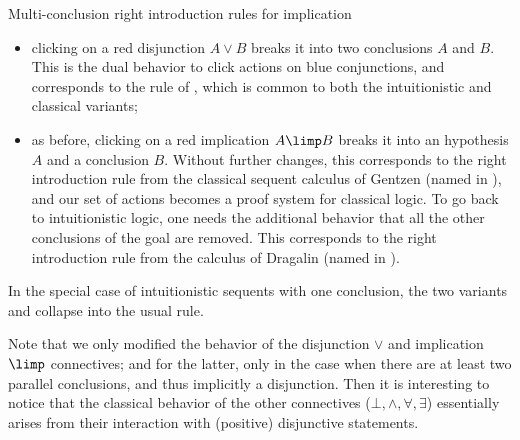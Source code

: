 \begin{marginfigure}
  \caption{Multi-conclusion right introduction rules for implication}
\end{marginfigure}

\begin{itemize}
  \item clicking on a red disjunction $A \lor B$ breaks it into two conclusions
  $A$ and $B$. This is the dual behavior to click actions on blue conjunctions,
  and corresponds to the {} rule of , which is
  common to both the intuitionistic and classical variants;
  \item as before, clicking on a red implication $A \limp B$ breaks it into an
  hypothesis $A$ and a conclusion $B$. Without further changes, this corresponds
  to the right introduction rule from the classical sequent calculus  of
  Gentzen (named {} in ), and
  our set of actions becomes a proof system for classical logic. To go back to
  intuitionistic logic, one needs the additional behavior that all the other
  conclusions of the goal are removed. This corresponds to the right
  introduction rule from the  calculus of Dragalin (named
  {} in ).
\end{itemize}

\begin{remark}
  In the special case of intuitionistic sequents with one conclusion, the two
  variants {} and {} collapse into the usual
  {} rule.
\end{remark}
Note that we only modified the behavior of the disjunction $\lor$ and
implication $\limp$ connectives; and for the latter, only in the case when there
are at least two parallel conclusions, and thus implicitly a disjunction. Then
it is interesting to notice that the classical behavior of the other connectives
($\bot, \land, \forall, \exists$) essentially arises from their interaction with
(positive) disjunctive statements.

